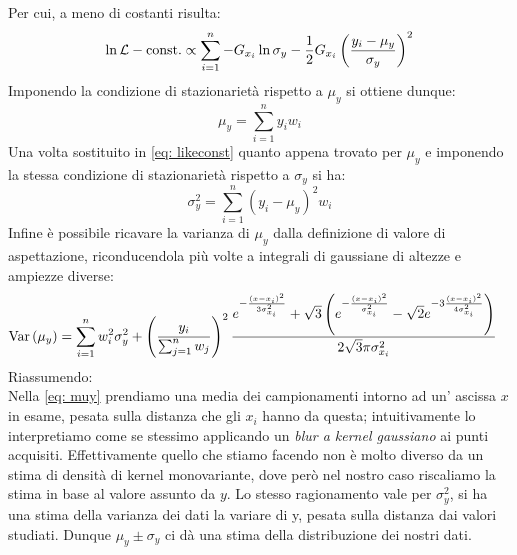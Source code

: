 \documentclass{article}[a4paper, oneside, 11pt]
\begin{document}
Per cui, a meno di costanti risulta:
\begin{equation}\label{eq: likeconst}
	\ln{\mathcal L} - \text{const.} \propto \sum_{i=1}^{n} -G_{x_i} \ln{\sigma_y}
	- \frac{1}{2} G_{x_i} \left( \frac{y_i - \mu_y}{\sigma_y} \right)^2
\end{equation}
Imponendo la condizione di stazionarietà rispetto a $\mu_y$ si ottiene dunque:
\begin{equation}\label{eq: muy}
	\mu_y = \sum_{i=1}^{n} y_i w_i 
\end{equation} 
Una volta sostituito in \eqref{eq: likeconst} quanto appena trovato per $\mu_y$
e imponendo la stessa condizione di stazionarietà rispetto a $\sigma_y$ si ha:
\begin{equation}\label{eq: sigmay}
	\sigma_y^2 = \sum_{i=1}^{n} (y_i - \mu_y)^2 w_i
\end{equation}
Infine è possibile ricavare la varianza di $\mu_y$ dalla definizione di valore
di aspettazione, riconducendola più volte a integrali di gaussiane di altezze
e ampiezze diverse:
\begin{align} \label{aln: varmuy}
	\text{Var}\left(\mu_y\right) &= \sum_{i=1}^{n} w_i^2 \sigma_y^2 + 
	\left(\frac{y_i}{\sum_{j=1}^{n} w_j} \right)^2 \frac{
	e^{-\frac{(x-x_i)^2}{3 \sigma_{x_i}^2}} +  
	\sqrt{3} \left( e^{-\frac{(x-x_i)^2}{\sigma_{x_i}^2}} -
	\sqrt{2} e^{-3 \frac{(x-x_i)^2}{4 \sigma_{x_i}^2}} \right)
	} {2 \sqrt{3}\pi \sigma_{x_i}^2} 
\end{align}
Riassumendo:\\
Nella \eqref{eq: muy} prendiamo una media dei campionamenti intorno ad un'
ascissa $x$ in esame, pesata sulla distanza che gli $x_i$ hanno da questa; 
intuitivamente lo interpretiamo come se stessimo applicando un 
\emph{blur a kernel gaussiano} ai punti acquisiti.
Effettivamente quello che stiamo facendo non è molto diverso da un stima
di densità di kernel monovariante, dove però nel nostro caso
riscaliamo la stima in base al valore assunto da $y$.
Lo stesso ragionamento vale per $\sigma_y^2$, si ha una stima della varianza
dei dati la variare di y, pesata sulla distanza dai valori studiati. Dunque
$\mu_y \pm \sigma_y$ ci dà una stima della distribuzione dei nostri dati.
\end{document}
